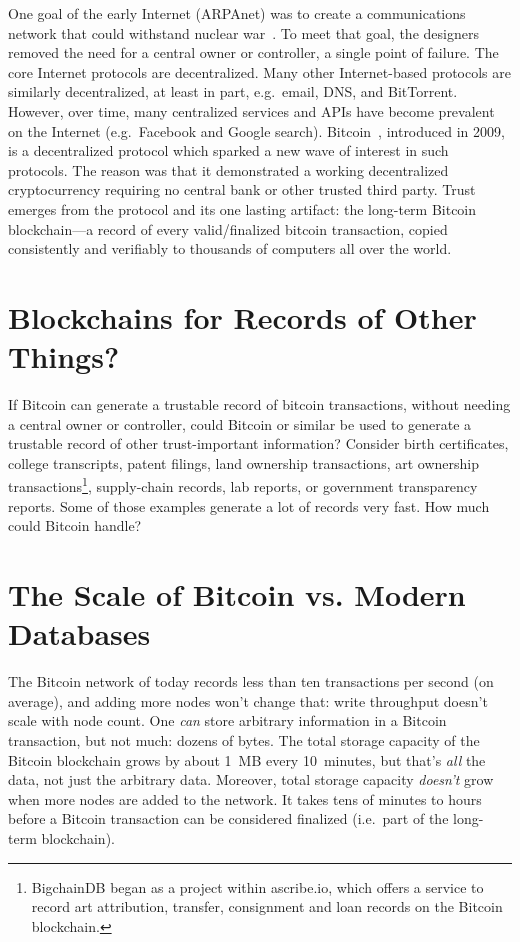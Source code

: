 \documentclass[a4paper]{article}
\begin{document}
One goal of the early Internet (ARPAnet) was to create a communications network
that could withstand nuclear war~\cite{arpanet_and_nuclear_war}.
To meet that goal, the designers removed the need for a central owner or
controller, a single point of failure.
The core Internet protocols are decentralized.
Many other Internet-based protocols are similarly decentralized,
at least in part, e.g.~email, DNS, and BitTorrent.
However, over time, many centralized services and APIs have become
prevalent on the Internet (e.g.~Facebook and Google search).
Bitcoin~\cite{nakamoto2009bitcoin}, introduced in 2009,
is a decentralized protocol
which sparked a new wave of interest in such protocols.
The reason was that it demonstrated a working decentralized cryptocurrency
requiring no central bank or other trusted third party.
Trust emerges from the protocol and its one lasting artifact:
the long-term Bitcoin blockchain---a record
of every valid/finalized bitcoin transaction,
copied consistently and verifiably to thousands
of computers all over the world.


\section{Blockchains for Records of Other Things?}

If Bitcoin can generate a trustable record of bitcoin transactions,
without needing a central owner or controller,
could Bitcoin or similar be used
to generate a trustable record of other trust-important information?
Consider
birth certificates,
college transcripts,
patent filings,
land ownership transactions,
art ownership transactions\footnote{BigchainDB
began as a project within ascribe.io,
which offers a service to record art attribution, transfer,
consignment and loan records on the Bitcoin blockchain.},
supply-chain records,
lab reports,
or
government transparency reports.
Some of those examples
generate a lot of records very fast.
How much could Bitcoin handle?


\section{The Scale of Bitcoin vs. Modern Databases}

The Bitcoin network of today records less than ten transactions per second (on average),
and adding more nodes won't change that: write throughput doesn't scale with node count.
One \emph{can} store arbitrary information in a Bitcoin transaction,
but not much: dozens of bytes.
The total storage capacity of the Bitcoin blockchain grows
by about 1~MB every 10~minutes, but that's \emph{all} the data, not just the arbitrary data.
Moreover, total storage capacity \emph{doesn't} grow when more nodes are added to the network.
It takes tens of minutes to hours before a Bitcoin transaction can be considered finalized
(i.e.~part of the long-term blockchain).
\end{document}
